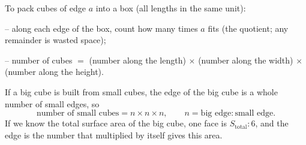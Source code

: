 \begin{knowbox}
To pack cubes of edge $a$ into a box (all lengths in the same unit):\par
\smallskip
-- along each edge of the box, count how many times $a$ fits (the quotient; any remainder is wasted space);\par
-- number of cubes $=$ (number along the length) $\times$ (number along the width) $\times$ (number along the height).\par
\smallskip
If a big cube is built from small cubes, the edge of the big cube is a whole number of small edges, so
\[\text{number of small cubes}=n\times n\times n,\qquad n=\text{big edge}:\text{small edge}.\]
If we know the total surface area of the big cube, one face is $S_{\text{total}}:6$, and the edge is the number that multiplied by itself gives this area.
\end{knowbox}


